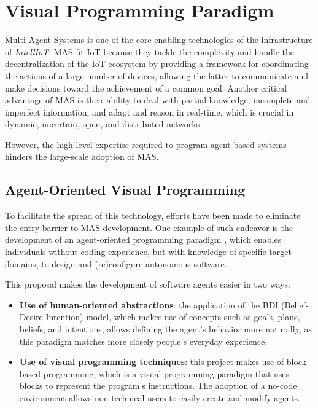 \section{Visual Programming Paradigm}
Multi-Agent Systems is one of the core enabling technologies of the infrastructure of \textit{IntellIoT}.
MAS fit IoT because they tackle the complexity and handle the decentralization of the IoT ecosystem by providing a framework for coordinating the actions of a large number of devices, allowing the latter to communicate and make decisions toward the achievement of a common goal.
Another critical advantage of MAS is their ability to deal with partial knowledge, incomplete and imperfect information, and adapt and reason in real-time, which is crucial in dynamic, uncertain, open, and distributed networks.

However, the high-level expertise required to program agent-based systems hinders the large-scale adoption of MAS.

\subsection{Agent-Oriented Visual Programming}
To facilitate the spread of this technology, efforts have been made to eliminate the entry barrier to MAS development.
One example of such endeavor is the development of an agent-oriented programming paradigm \cite{burattini2022agent}, which enables individuals without coding experience, but with knowledge of specific target domains, to design and (re)configure autonomous software.

This proposal makes the development of software agents easier in two ways:
\begin{itemize}
    \item \textbf{Use of human-oriented abstractions}: the application of the BDI (Belief-Desire-Intention) model, which makes use of concepts such as goals, plans, beliefs, and intentions, allows defining the agent's behavior more naturally, as this paradigm matches more closely people's everyday experience.
    \item \textbf{Use of visual programming techniques}: this project makes use of block-based programming, which is a visual programming paradigm that uses blocks to represent the program's instructions.
    The adoption of a no-code environment allows non-technical users to easily create and modify agents.
\end{itemize}

